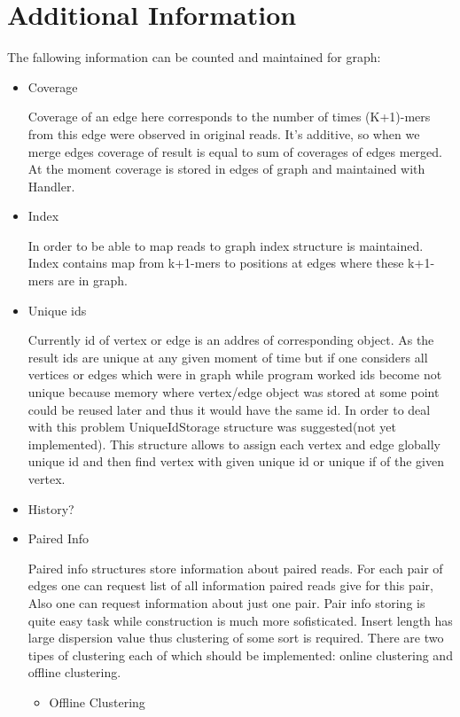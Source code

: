 \documentclass[14pt]{article}
\begin{document}
\section{Additional Information}
The fallowing information can be counted and maintained for graph:

\begin{itemize}
\item Coverage

Coverage of an edge here corresponds to the number of times (K+1)-mers from this edge were observed in original reads. It's additive, so when we merge edges coverage of result is equal to sum of coverages of edges merged. At the moment coverage is stored in edges of graph and maintained with Handler.

\item Index

In order to be able to map reads to graph index structure is maintained. Index contains map from k+1-mers to positions at edges where these k+1-mers are in graph.

\item Unique ids

Currently id of vertex or edge is an addres of corresponding object. As the result ids are unique at any given moment of time but if one considers all vertices or edges which were in graph while program worked ids become not unique because memory where vertex/edge object was stored at some point could be reused later and thus it would have the same id. In order to deal with this problem UniqueIdStorage structure was suggested(not yet implemented). This structure allows to assign each vertex and edge globally unique id and then find vertex with given unique id or unique if of the given vertex.

\item History?

\item Paired Info

Paired info structures store information about paired reads. For each pair of edges one can request list of all information paired reads give for this pair, Also one can request information about just one pair. Pair info storing is quite easy task while construction is much more sofisticated. Insert length has large dispersion value thus clustering of some sort is required. There are two tipes of clustering each of which should be implemented: online clustering and offline clustering.

\begin{itemize}
\item Offline Clustering


\end{itemize}
\end{itemize}
\end{document}
